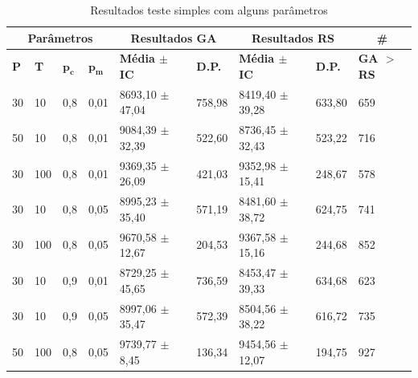 \begin{table}[h]
	\begin{tabular}{|l|l|l|l|l|l|l|l|l|}
		\hline
		\multicolumn{4}{|c|}{\textbf{Parâmetros}} & \multicolumn{2}{c|}{\textbf{Resultados GA}} & \multicolumn{2}{c|}{\textbf{Resultados RS}} & \multicolumn{1}{c|}{\textbf{\#}} \\ \hline
		\textbf{P}     & \textbf{T}      & $\bm{p_c}$   & $\bm{p_m}$   & \textbf{Média $\pm$ IC}            & \textbf{D.P.}       & \textbf{Média $\pm$ IC}              & \textbf{D.P.}           & \textbf{GA $>$ RS}                                                               \\ \hline
		30    & 10     & 0,8	& 0,01    & 8693,10 $\pm$ 47,04     & 758,98    & 8419,40 $\pm$ 39,28       & 633,80        & 659                                                            \\ \hline
		50    & 10     & 0,8	& 0,01    & 9084,39 $\pm$ 32,39     & 522,60    & 8736,45 $\pm$ 32,43       & 523,22        & 716                                                            \\ \hline
		30    & 100    & 0,8	& 0,01    & 9369,35 $\pm$ 26,09     & 421,03    & 9352,98 $\pm$ 15,41       & 248,67        & 578                                                            \\ \hline
		30    & 10     & 0,8	& 0,05    & 8995,23 $\pm$ 35,40     & 571,19    & 8481,60 $\pm$ 38,72       & 624,75        & 741                                                            \\ \hline
		30    & 100    & 0,8	& 0,05    & 9670,58 $\pm$ 12,67     & 204,53    & 9367,58 $\pm$ 15,16       & 244,68        & 852                                                            \\ \hline
		30    & 10     & 0,9	& 0,01    & 8729,25 $\pm$ 45,65     & 736,59    & 8453,47 $\pm$ 39,33       & 634,68        & 623                                                            \\ \hline
		30    & 10     & 0,9	& 0,05    & 8997,06 $\pm$ 35,47     & 572,39    & 8504,56 $\pm$ 38,22       & 616,72        & 735                                                            \\ \hline
		50    & 100    & 0,8	& 0,05    & 9739,77 $\pm$ 8,45      & 136,34    & 9454,56 $\pm$ 12,07       & 194,75       & 927                                                            \\ \hline
	\end{tabular}
	\caption{Resultados teste simples com alguns parâmetros}
	\label{tab:resultados_teste1}
\end{table}

